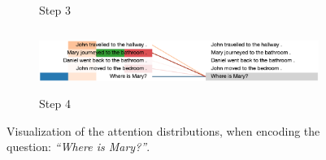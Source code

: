 \begin{figure}[!h]
\begin{minipage}{\textwidth}
\begin{subfigure}[t]{\textwidth}
        \caption{Step 3}
    \end{subfigure}
    \hfill \hfill 
    \begin{subfigure}[t]{\textwidth}
        \centering
        \includegraphics[height=0.8in]{04-part-03/chapter-06/figs_and_tables/figs_attention_babi/e1-step4}
        \caption{Step 4}
    \end{subfigure}
\end{minipage}
    \caption{Visualization of the attention distributions, when encoding the question: \emph{``Where is Mary?''}.}
\end{figure}
\afterpage{\clearpage}





